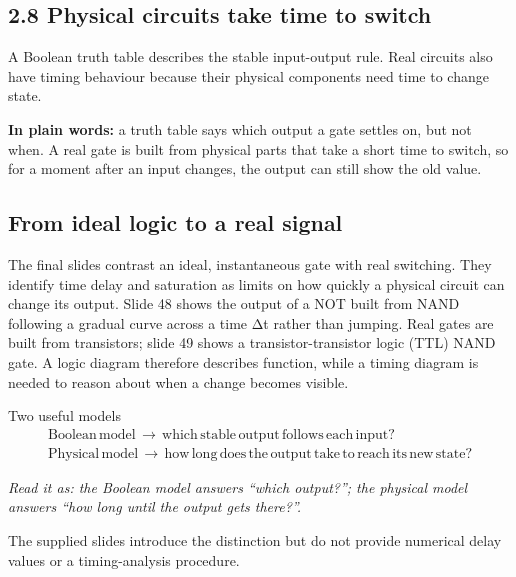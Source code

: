 \documentclass[11pt]{article}
\begin{document}
\begin{keepsection}
\section{2.8 Physical circuits take time to switch}

A Boolean truth table describes the stable input-output rule. Real circuits also have timing behaviour because their physical components need time to change state.

\begin{plainbox}\textbf{In plain words:} a truth table says which output a gate settles on, but not when. A real gate is built from physical parts that take a short time to switch, so for a moment after an input changes, the output can still show the old value.\end{plainbox}

\begin{keepsection}
\subsection{From ideal logic to a real signal}

The final slides contrast an ideal, instantaneous gate with real switching. They identify time delay and saturation as limits on how quickly a physical circuit can change its output. Slide 48 shows the output of a NOT built from NAND following a gradual curve across a time Δt rather than jumping. Real gates are built from transistors; slide 49 shows a transistor-transistor logic (TTL) NAND gate. A logic diagram therefore describes function, while a timing diagram is needed to reason about when a change becomes visible.

\begin{equationcard}{Two useful models}
\[ \begin{gathered} \text{Boolean}\, \text{model}\, \to \, \text{which}\, \text{stable}\, \text{output}\, \text{follows}\, \text{each}\, \text{input}? \\ \text{Physical}\, \text{model}\, \to \, \text{how}\, \text{long}\, \text{does}\, \text{the}\, \text{output}\, \text{take}\, \text{to}\, \text{reach}\, \text{its}\, \text{new}\, \text{state}? \end{gathered} \]
{\small \emph{Read it as: the Boolean model answers “which output?”; the physical model answers “how long until the output gets there?”.}\par The supplied slides introduce the distinction but do not provide numerical delay values or a timing-analysis procedure.}
\end{equationcard}


\end{keepsection}
\end{keepsection}
\end{document}
